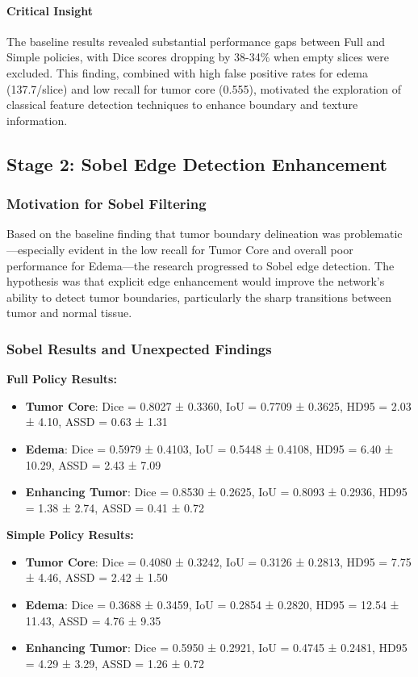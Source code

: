 \paragraph{Critical Insight} The baseline results revealed substantial performance gaps between Full and Simple policies, with Dice scores dropping by 38-34\% when empty slices were excluded. This finding, combined with high false positive rates for edema (137.7/slice) and low recall for tumor core (0.555), motivated the exploration of classical feature detection techniques to enhance boundary and texture information.

\subsection{Stage 2: Sobel Edge Detection Enhancement}

\subsubsection{Motivation for Sobel Filtering}

Based on the baseline finding that tumor boundary delineation was problematic—especially evident in the low recall for Tumor Core and overall poor performance for Edema—the research progressed to Sobel edge detection. The hypothesis was that explicit edge enhancement would improve the network's ability to detect tumor boundaries, particularly the sharp transitions between tumor and normal tissue.

\subsubsection{Sobel Results and Unexpected Findings}

\textbf{Full Policy Results:}
\begin{itemize}
    \item \textbf{Tumor Core}: Dice = 0.8027 ± 0.3360, IoU = 0.7709 ± 0.3625, HD95 = 2.03 ± 4.10, ASSD = 0.63 ± 1.31
    \item \textbf{Edema}: Dice = 0.5979 ± 0.4103, IoU = 0.5448 ± 0.4108, HD95 = 6.40 ± 10.29, ASSD = 2.43 ± 7.09
    \item \textbf{Enhancing Tumor}: Dice = 0.8530 ± 0.2625, IoU = 0.8093 ± 0.2936, HD95 = 1.38 ± 2.74, ASSD = 0.41 ± 0.72
\end{itemize}

\textbf{Simple Policy Results:}
\begin{itemize}
    \item \textbf{Tumor Core}: Dice = 0.4080 ± 0.3242, IoU = 0.3126 ± 0.2813, HD95 = 7.75 ± 4.46, ASSD = 2.42 ± 1.50
    \item \textbf{Edema}: Dice = 0.3688 ± 0.3459, IoU = 0.2854 ± 0.2820, HD95 = 12.54 ± 11.43, ASSD = 4.76 ± 9.35
    \item \textbf{Enhancing Tumor}: Dice = 0.5950 ± 0.2921, IoU = 0.4745 ± 0.2481, HD95 = 4.29 ± 3.29, ASSD = 1.26 ± 0.72
\end{itemize}

